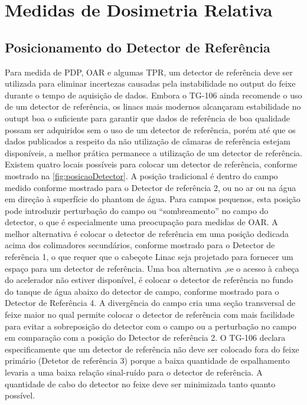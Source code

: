 \documentclass[11pt,a4paper]{article}
\begin{document}
\section{Medidas de Dosimetria Relativa}

\subsection{Posicionamento do Detector de Referência}

	Para medida de PDP, OAR e algumas TPR, um detector de referência deve ser utilizada para eliminar incertezas causadas pela instabilidade no output do feixe durante o tempo de aquisição de dados. Embora o TG-106 ainda recomende o uso de um detector de referência, os linacs mais modernos alcançaram estabilidade no outupt boa o suficiente para garantir que  dados de referência de boa qualidade possam ser adquiridos sem o uso de um detector de referência, porém até que os dados publicados a respeito da não utilização de câmaras de referência estejam disponíveis, a melhor prática permanece a utilização de um detector de referência. Existem quatro locais possíveis para colocar um detector de referência, conforme mostrado na \ref{fig:posicaoDetector}. A posição tradicional é dentro do campo medido conforme mostrado para o Detector de referência 2, ou no ar ou na água em direção à superfície do phantom de água. Para campos pequenos, esta posição pode introduzir perturbação do campo ou ``sombreamento'' no campo do detector, o que é especialmente uma preocupação para medidas de OAR. A melhor alternativa é colocar o detector de referência em uma posição dedicada acima dos colimadores secundários, conforme mostrado para o Detector de referência 1, o que requer que o cabeçote Linac seja projetado para fornecer um espaço para um detector de referência. Uma boa alternativa ,se o acesso à cabeça do acelerador não estiver disponível, é colocar o detector de referência no fundo do tanque de água abaixo do detector de campo, conforme mostrado para o Detector de Referência 4. A divergência do campo cria uma seção transversal de feixe maior no qual permite colocar o detector de referência com mais facilidade para evitar a sobreposição do detector com o campo ou a perturbação no campo em comparação com a posição do Detector de referência 2. O TG-106 declara especificamente que um detector de referência não deve ser colocado fora do feixe primário (Detetor de referência 3) porque a baixa quantidade de espalhamento levaria a uma baixa relação sinal-ruído para o detector de referência. A quantidade de cabo do detector no feixe deve ser minimizada tanto quanto possível.
\end{document}
